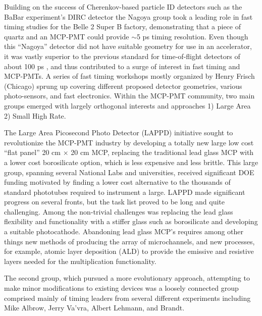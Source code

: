
Building on the success of Cherenkov-based particle ID detectors such as the BaBar experiment's DIRC detector\cite{DIRC} the Nagoya group\cite{Nagoya} took a leading role in fast timing studies for the Belle 2 Super B factory, demonstrating that a piece of quartz and an MCP-PMT could provide  $\sim$5 ps timing resolution\cite{Nagdet}. Even though this ``Nagoya'' detector did not have suitable geometry for use in an accelerator, it was vastly superior to the previous standard for time-of-flight detectors of about 100 ps \cite{TOF}, and thus contributed to a surge of interest in fast timing and MCP-PMTs.  A series of fast timing workshops mostly organized by Henry Frisch (Chicago) sprung up covering different proposed detector geometries, various photo-sensors, and fast electronics. Within the MCP-PMT community, two main groups emerged with largely orthogonal interests and approaches 1) Large Area 2) Small High Rate.  

The Large Area Picosecond Photo Detector (LAPPD)\cite{LAPPD} initiative  sought to revolutionize the MCP-PMT industry by developing a totally new large low cost ``flat panel'' 20 cm $\times$ 20 cm MCP, replacing the traditional lead glass MCP with a lower cost borosilicate option, which is less expensive and less brittle. This large group, spanning several National Labs and universities, received significant DOE funding motivated by finding a lower cost alternative to the thousands of standard phototubes required to instrument a large. LAPPD made significant progress on several fronts, but the task list proved to be long and quite challenging. Among the non-trivial challenges was replacing the lead glass flexibility and functionality with a stiffer glass such as borosilicate and developing a suitable photocathode. Abandoning lead glass MCP's requires among other things new methods of producing the array of microchannels, and new processes, for example, atomic layer deposition (ALD)\cite{ALD} to provide the emissive and resistive layers needed for the multiplication functionality. 

The second group, which pursued a more evolutionary approach, attempting to make minor modifications to existing devices was a loosely connected group comprised mainly of timing leaders from several different experiments including Mike Albrow, Jerry Va'vra, Albert Lehmann, and Brandt.


